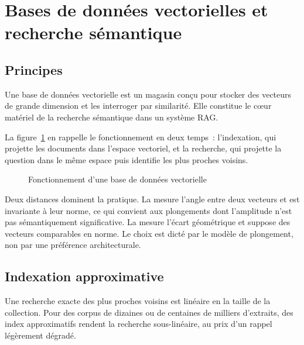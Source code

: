 \section{Bases de données vectorielles et recherche sémantique}
\label{sec:ch1-vecteurs}

\subsection{Principes}

Une base de données vectorielle est un magasin conçu pour stocker des vecteurs
de grande dimension et les interroger par similarité. Elle constitue le
c\oe ur matériel de la recherche sémantique dans un système RAG.

La figure~\ref{fig:base-vectorielle} en rappelle le fonctionnement en deux
temps~: l'indexation, qui projette les documents dans l'espace vectoriel, et
la recherche, qui projette la question dans le même espace puis identifie
les plus proches voisins.

\begin{figure}[htbp]
  \centering
  \resizebox{\linewidth}{!}{}
  \caption{Fonctionnement d'une base de données vectorielle}
  \label{fig:base-vectorielle}
\end{figure}

Deux distances dominent la pratique. La  mesure
l'angle entre deux vecteurs et est invariante à leur norme, ce qui convient
aux plongements dont l'amplitude n'est pas sémantiquement significative. La
 mesure l'écart géométrique et suppose des
vecteurs comparables en norme. Le choix est dicté par le modèle de
plongement, non par une préférence architecturale.

\subsection{Indexation approximative}

Une recherche exacte des plus proches voisins est linéaire en la taille de
la collection. Pour des corpus de dizaines ou de centaines de milliers
d'extraits, des index approximatifs rendent la recherche sous-linéaire, au
prix d'un rappel légèrement dégradé.

